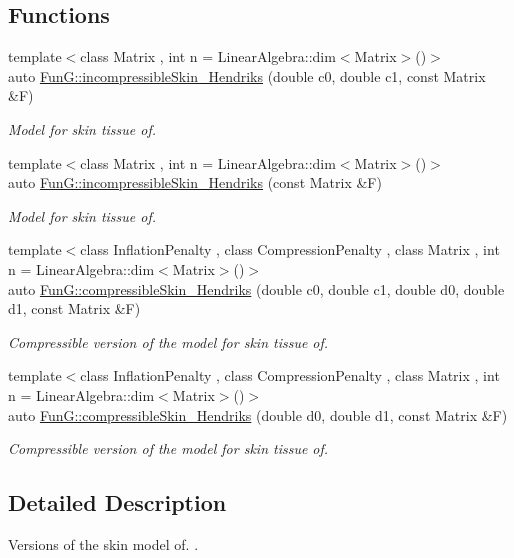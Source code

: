 \subsection*{\-Functions}
\begin{DoxyCompactItemize}
\item 
{\footnotesize template$<$class Matrix , int n = \-Linear\-Algebra\-::dim$<$\-Matrix$>$()$>$ }\\auto \hyperlink{group__Biomechanics_gaa20bf15ef6976d64d89490429035b2c4}{\-Fun\-G\-::incompressible\-Skin\-\_\-\-Hendriks} (double c0, double c1, const \-Matrix \&\-F)
\begin{DoxyCompactList}\small\item\em \-Model for skin tissue of. \end{DoxyCompactList}\item 
{\footnotesize template$<$class Matrix , int n = \-Linear\-Algebra\-::dim$<$\-Matrix$>$()$>$ }\\auto \hyperlink{group__Biomechanics_gad8653218bd2afb4e3cfd601a5142956c}{\-Fun\-G\-::incompressible\-Skin\-\_\-\-Hendriks} (const \-Matrix \&\-F)
\begin{DoxyCompactList}\small\item\em \-Model for skin tissue of. \end{DoxyCompactList}\item 
{\footnotesize template$<$class Inflation\-Penalty , class Compression\-Penalty , class Matrix , int n = \-Linear\-Algebra\-::dim$<$\-Matrix$>$()$>$ }\\auto \hyperlink{group__Biomechanics_ga07b4c52c6ecf7e72f73ab5832fb262cd}{\-Fun\-G\-::compressible\-Skin\-\_\-\-Hendriks} (double c0, double c1, double d0, double d1, const \-Matrix \&\-F)
\begin{DoxyCompactList}\small\item\em \-Compressible version of the model for skin tissue of. \end{DoxyCompactList}\item 
{\footnotesize template$<$class Inflation\-Penalty , class Compression\-Penalty , class Matrix , int n = \-Linear\-Algebra\-::dim$<$\-Matrix$>$()$>$ }\\auto \hyperlink{group__Biomechanics_ga42721e772b7eada1b0bca98247ad440f}{\-Fun\-G\-::compressible\-Skin\-\_\-\-Hendriks} (double d0, double d1, const \-Matrix \&\-F)
\begin{DoxyCompactList}\small\item\em \-Compressible version of the model for skin tissue of. \end{DoxyCompactList}\end{DoxyCompactItemize}


\subsection{\-Detailed \-Description}
\-Versions of the skin model of. \cite{Hendriks2005}. 